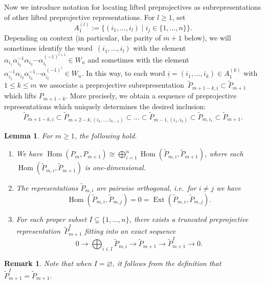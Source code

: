 \documentclass{amsart}
\newtheorem{lemma}[theorem]{Lemma}
\newtheorem{remark}[theorem]{Remark}
\numberwithin{equation}{section}
\newcommand{\ui}{{\underline i}}
\newcommand{\Ext}{\operatorname{Ext}}
\newcommand{\Hom}{\operatorname{Hom}}
\newcommand{\ses}[3]{0\rightarrow #1\rightarrow #2\rightarrow#3\rightarrow 0}
\begin{document}
Now we introduce notation for locating lifted preprojectives as subrepresentations of other lifted preprojective representations.
For $l\ge1$, set
\[A_1^{(l)}:=\{(i_1,\ldots,i_l)\mid i_j\in\{1,\ldots,n\}\}.\]
Depending on context (in particular, the parity of $m+1$ below), we will sometimes identify the word~$(i_1,\ldots,i_l)$ with the element $\alpha_{i_1}\alpha_{i_2}^{-1}\alpha_{i_3}\cdots\alpha_{i_l}^{(-1)^{l+1}}\in W_n$ and sometimes with the element $\alpha_{i_1}^{-1}\alpha_{i_2}\alpha_{i_3}^{-1}\cdots\alpha_{i_l}^{(-1)^l}\in W_n$.
In this way, to each word $\ui=(i_1,\ldots,i_k)\in A_1^{(k)}$ with $1\leq k\leq m$ we associate a preprojective subrepresentation~$\tilde P_{m+1-k,\ui}\subset\tilde P_{m+1}$ which lifts $P_{m+1-k}$.
More precisely, we obtain a sequence of preprojective representations which uniquely determines the desired inclusion:
\[\tilde P_{m+1-k,\ui}\subset \tilde P_{m+2-k,(i_1,\ldots,i_{k-1})}\subset\ldots\subset \tilde P_{m-1,(i_1,i_2)}\subset \tilde P_{m,i_1}\subset\tilde P_{m+1}.\]
\begin{lemma}
  \label{le:homdecomposition}
  For $m\geq 1$, the following hold.
  \begin{enumerate}
    \item We have $\Hom(P_m,P_{m+1})\cong\bigoplus\limits_{i=1}^n \Hom(\tilde P_{m,i},\tilde P_{m+1})$, where each $\Hom(\tilde P_{m,i},\tilde P_{m+1})$ is one-dimensional.
    \item The representations $\tilde P_{m,i}$ are pairwise orthogonal, i.e.\ for $i\neq j$ we have 
      \[\Hom(\tilde P_{m,i},\tilde P_{m,j})=0=\Ext(\tilde P_{m,i},\tilde P_{m,j}).\]
    \item For each proper subset $I\subsetneq\{1,\ldots,n\}$, there exists a truncated preprojective representation~$\tilde P_{m+1}^I$ fitting into an exact sequence 
      \begin{equation}
        \label{ses1}
        \ses{\bigoplus_{i\in I} \tilde P_{m,i}}{\tilde P_{m+1}}{\tilde P_{m+1}^I}.
      \end{equation}
  \end{enumerate}
\end{lemma}
\begin{remark}
  Note that when $I=\varnothing$, it follows from the definition that $\tilde P_{m+1}^I=\tilde P_{m+1}$.
\end{remark}
\end{document}
